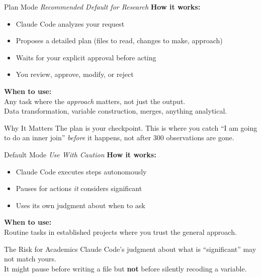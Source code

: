 \documentclass[aspectratio=169, 11pt]{beamer}
\begin{document}
\begin{frame}{Plan Mode \hfill \normalsize\textit{Recommended Default for Research}}
  \textbf{How it works:}
  \begin{itemize}
    \item Claude Code analyzes your request
    \item Proposes a detailed plan (files to read, changes to make, approach)
    \item Waits for your explicit approval before acting
    \item You review, approve, modify, or reject
  \end{itemize}

  \vspace{0.5em}
  \textbf{When to use:}\\
  Any task where the \textit{approach} matters, not just the output.\\
  Data transformation, variable construction, merges, anything analytical.

  \vspace{0.5em}
  \begin{block}{Why It Matters}
    The plan is your checkpoint. This is where you catch ``I am going to do an inner join'' \textit{before} it happens, not after 300 observations are gone.
  \end{block}
\end{frame}

\begin{frame}{Default Mode \hfill \normalsize\textit{Use With Caution}}
  \textbf{How it works:}
  \begin{itemize}
    \item Claude Code executes steps autonomously
    \item Pauses for actions \textit{it} considers significant
    \item Uses its own judgment about when to ask
  \end{itemize}

  \vspace{0.5em}
  \textbf{When to use:}\\
  Routine tasks in established projects where you trust the general approach.

  \vspace{0.8em}
  \begin{alertblock}{The Risk for Academics}
    Claude Code's judgment about what is ``significant'' may not match yours.\\
    It might pause before writing a file but \textbf{not} before silently recoding a variable.
  \end{alertblock}
\end{frame}
\end{document}
